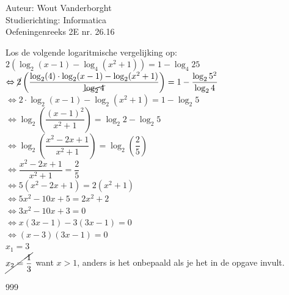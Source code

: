 \documentclass[a4paper]{article}
\begin{document}
  
\noindent \large Auteur: Wout Vanderborght\\
\noindent \large Studierichting: Informatica\\
\noindent \large Oefeningenreeks 2E nr. 26.16\\

\medskip

\normalsize

Los de volgende logaritmische vergelijking op: \\

$ 2\left( \log_2(x-1) - \log_4(x^2+1) \right) = 1 - \log_4 25 $ \\

$ \Leftrightarrow \cancel{2}\left( \dfrac{\log_2 (4) \cdot \log_2 (x-1) - \log_2(x^2+1)}{\cancel{\log_2 4}} \right) = 1 - \dfrac{\log_2 5^2}{\log_2 4} $ \\

$ \Leftrightarrow 2 \cdot \log_2 (x-1) - \log_2(x^2+1) = 1 - \log_2 5 $ \\

$ \Leftrightarrow \log_2 \left(\dfrac{(x-1)^2}{x^2+1}\right) = \log_2 2 - \log_2 5 $ \\

$ \Leftrightarrow \log_2 \left(\dfrac{x^2-2x + 1}{x^2+1}\right) = \log_2 \left(\dfrac{2}{5}\right) $ \\

$ \Leftrightarrow \dfrac{x^2-2x + 1}{x^2+1} = \dfrac{2}{5} $ \\

$ \Leftrightarrow 5(x^2-2x + 1) = 2(x^2+1) $ \\

$ \Leftrightarrow 5x^2 - 10x + 5 = 2x^2 + 2 $ \\

$ \Leftrightarrow 3x^2 - 10x + 3 = 0 $ \\

$ \Leftrightarrow x(3x-1) - 3(3x-1) = 0 $ \\

$ \Leftrightarrow (x-3)(3x-1) = 0 $ \\

$ x_1 = 3 $ \\

$ \cancel{x_2 = \dfrac{1}{3}} $ want $ x > 1 $, anders is het onbepaald als je het in de opgave invult. 

\begin{thebibliography}{999}
\end{thebibliography}
\end{document}
